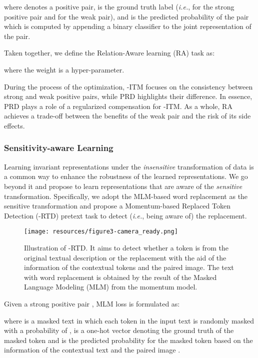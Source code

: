 \documentclass{article}
\begin{document}
where  denotes a positive pair,  is the ground truth label (\emph{i.e.},  for the strong positive pair and  for the weak pair), and  is the predicted probability of the pair which is computed by appending a binary classifier to the joint representation  of the pair.

Taken together, we define the Relation-Aware learning (RA) task as:

where the weight  is a hyper-parameter.

During the process of the optimization, -ITM focuses on the consistency between strong and weak positive pairs, while PRD highlights their difference.
In essence, PRD plays a role of a regularized compensation for -ITM. 
As a whole, RA achieves a trade-off between the benefits of the weak pair and the risk of its side effects.

\subsubsection{Sensitivity-aware Learning}
Learning invariant representations under the \emph{insensitive} transformation of data is a common way to enhance the robustness of the learned representations.
We go beyond it and propose to learn representations that are aware of the \emph{sensitive} transformation.
Specifically, we adopt the MLM-based word replacement as the sensitive transformation and propose a Momentum-based Replaced Token Detection (-RTD) pretext task to detect (\emph{i.e.}, being aware of) the replacement.

\begin{figure}[t]
\centering
\texttt{[image: resources/figure3-camera\_ready.png]} \caption{Illustration of -RTD. It aims to detect whether a token is from the original textual description or the replacement with the aid of the information of the contextual tokens and the paired image. The text with word replacement is obtained by the result of the Masked Language Modeling (MLM) from the momentum model.}
\label{fig3}
\end{figure}

Given a strong positive pair , MLM loss is formulated as:

where  is a masked text in which each token in the input text  is randomly masked with a probability of ,  is a one-hot vector denoting the ground truth of the masked token and  is the predicted probability for the masked token based on the information of the contextual text  and the paired image . 
\end{document}
